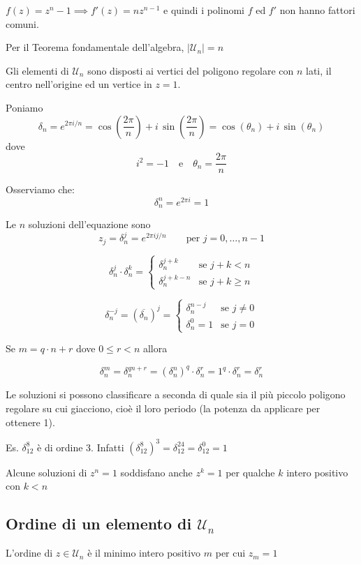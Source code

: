 \documentclass[11pt]{article}
\newcommand{\calU}{\mathcal{U}}
\begin{document}
    $f(z) = z^n-1 \implies f'(z) = n z^{n-1}$ e quindi i polinomi $f$ ed $f'$ non hanno fattori comuni.
    
    Per il Teorema fondamentale dell'algebra, $|\calU_n| = n$
    
    Gli elementi di $\calU_n$ sono disposti ai vertici del poligono regolare con $n$ lati, il centro nell'origine ed un vertice in $z = 1$.
    
    Poniamo
    $$
    \delta_n = e^{2\pi i /n} = \cos \left(\frac{2\pi}{n}\right) + i \, \sin\left(\frac{2\pi}{n}\right) = \cos(\theta_n) + i \, \sin(\theta_n)
    $$
    dove
    $$
    i^2 = -1 \quad \text{e} \quad \theta_n = \frac{2\pi}{n}
    $$
    
    Osserviamo che:
    $$
    \delta_n^n=e^{2\pi i} = 1
    $$
    
    Le $n$ soluzioni dell'equazione sono
    $$
    z_j = \delta_n^j = e^{2 \pi i j / n} \qquad \text{per } j=0,\dots, n-1
    $$

    $$
    \delta_n^j \cdot \delta_n^k =
    \begin{cases}
        \delta_n^{j+k} & \text{se } j+k < n \\
        \delta_n^{j+k-n} & \text{se } j+k \geq n
    \end{cases}
    $$

    $$
    \delta_n^{-j} = (\overline{\delta_n})^j =
    \begin{cases}
        \delta_n^{n-j} & \text{se } j \neq 0\\
        \delta_n^0 = 1 & \text{se } j = 0
    \end{cases}
    $$

    Se $m = q \cdot n + r$ dove $0 \leq r < n$ allora

    $$
        \delta_n^m = \delta_n^{qn+r} = (\delta_n^n)^q \cdot \delta_n^r = 1^q \cdot \delta_n^r = \delta_n^r
    $$

    Le soluzioni si possono classificare a seconda di quale sia il più piccolo poligono regolare su cui giacciono, cioè il loro periodo (la potenza da applicare per ottenere 1).

    Es. $\delta_{12}^8$ è di ordine 3. Infatti $(\delta_{12}^8)^3 = \delta_{12}^{24} = \delta_{12}^0 = 1$

    Alcune soluzioni di $z^n = 1$ soddisfano anche $z^k = 1$ per qualche $k$ intero positivo con $k<n$

\subsection{Ordine di un elemento di $\calU_n$}
    L'ordine di $z \in \calU_n$ è il minimo intero positivo $m$ per cui $z_m = 1$
\end{document}
